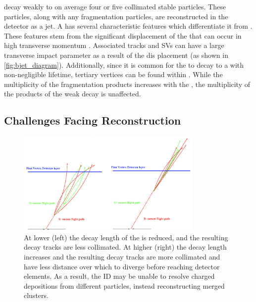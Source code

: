 \bhadrons decay weakly to on average four or five collimated stable particles.
These particles, along with any fragmentation particles, are reconstructed in the detector as a jet.
A \bjet has several characteristic features which differentiate it from \ljets.
These features stem from the significant displacement of the \bhadron that can occur in high transverse momentum \bjets.
Associated tracks and SVs can have a large transverse impact parameter \dzero as a result of the \bhadron dis placement (as shown in \cref{fig:bjet_diagram}).
Additionally, since it is common for the \bhadron to decay to a \chadron with non-negligible lifetime, tertiary vertices can be found within \bjets.
While the multiplicity of the fragmentation products increases with the \bhadron \pt, the  multiplicity of the products of the weak decay is unaffected.




\subsection{Challenges Facing \bhadron Reconstruction}\label{sec:b_track_reco_challenges}

\begin{figure}[!htbp]
  \centering
  \includegraphics[width=0.8\textwidth]{chapters/3.tracking/figs/high-pt-b-tracks.png}
  \caption{
    At lower \pt (left) the decay length of the \bhadron is reduced, and the resulting decay tracks are less collimated.
    At higher \pt (right) the \bhadron decay length increases and the resulting decay tracks are more collimated and have less distance over which to diverge before reaching detector elements.
    As a result, the ID may be unable to resolve charged depositions from different particles, instead reconstructing merged clusters.
  }
  \label{fig:high_pt_b_decay}
\end{figure}

